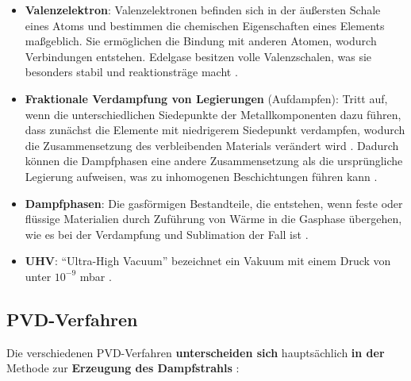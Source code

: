 \documentclass{article} %
\begin{document}
\begin{itemize}
    \cite{atkins2010, feynman2011}. Da sie oft instabil sind, neigen sie dazu, mit anderen Molekülen oder Atomen zu reagieren, um eine stabile 
    Elektronenkonfiguration zu erreichen\footnote{Im Kontext von Dünnschichtprozessen wie dem Sputtern werden Radikale oft durch das energiereiche Plasma gebildet, 
    das Bindungen in Molekülen aufbrechen kann \cite{boehler1994, hutchings2018}. Diese Radikale können dann auf der Oberfläche der zu beschichtenden Materialien 
    reagieren, wodurch die Schichtzusammensetzung und -struktur beeinflusst wird \cite{journal_reference}.}.
    \item \textbf{Valenzelektron}: Valenzelektronen befinden sich in der äußersten Schale eines Atoms und bestimmen die chemischen Eigenschaften eines Elements 
    maßgeblich. Sie ermöglichen die Bindung mit anderen Atomen, wodurch Verbindungen entstehen. Edelgase besitzen volle Valenzschalen, was sie besonders stabil und 
    reaktionsträge macht \cite{petrucci_general_chemistry, chang_chemistry, brown_chemistry_textbook}.
    \item \textbf{Fraktionale Verdampfung von Legierungen} (Aufdampfen): Tritt auf, wenn die unterschiedlichen Siedepunkte der Metallkomponenten dazu führen, dass 
    zunächst die Elemente mit niedrigerem Siedepunkt verdampfen, wodurch die Zusammensetzung des verbleibenden Materials verändert wird \cite{harvard_mrsec, 
    vem_guide}. Dadurch können die Dampfphasen eine andere Zusammensetzung als die ursprüngliche Legierung aufweisen, was zu inhomogenen Beschichtungen führen 
    kann \cite{frontiers_mpea, mdpi_vacuum_distillation}.
    \item \textbf{Dampfphasen}: Die gasförmigen Bestandteile, die entstehen, wenn feste oder flüssige Materialien durch Zuführung von Wärme in die Gasphase 
    übergehen, wie es bei der Verdampfung und Sublimation der Fall ist \cite{thermopedia, thoughtco, opentextbc}.
    \item \textbf{UHV}: ``Ultra-High Vacuum'' bezeichnet ein Vakuum mit einem Druck von unter \(10^{-9}\) mbar \cite{atkins_physical_chemistry, ohring2002, 
    smith1995}.
\end{itemize}

\vspace{1em}
\subsection{PVD-Verfahren} %
Die verschiedenen PVD-Verfahren \textbf{unterscheiden sich} hauptsächlich \textbf{in der} Methode zur \textbf{Erzeugung des Dampfstrahls} 
\cite{keplinger2024}:
\end{document}
